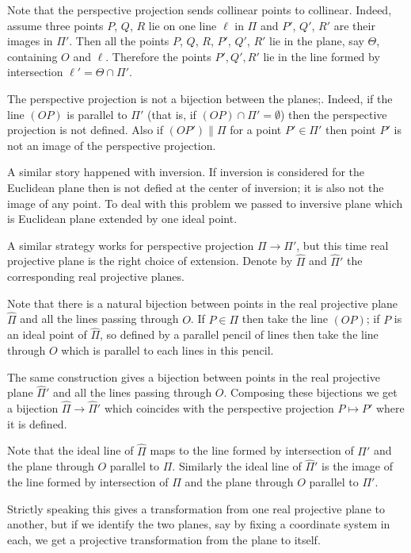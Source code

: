 Note that the perspective projection sends collinear points to collinear.
Indeed, assume three points $P$, $Q$, $R$ lie on one line $\ell$ in $\Pi$
and $P'$, $Q'$, $R'$ are their images in $\Pi'$.
Then all the points $P$, $Q$, $R$, $P'$, $Q'$, $R'$ lie in the plane, say $\Theta$, containing $O$ and $\ell$.
Therefore the points $P',Q',R'$ lie in the line formed by intersection $\ell'=\Theta\cap \Pi'$.

The perspective projection is not a bijection between the planes;.
Indeed, if the line $(OP)$ is parallel to $\Pi'$ 
(that is, if $(OP)\cap\Pi'=\emptyset$)
then the perspective projection is not defined.
Also if  $(OP')\parallel \Pi$ 
for a point $P'\in \Pi'$
then point $P'$ is not an image of the perspective projection.

A similar story happened with inversion.
If inversion is considered for the Euclidean plane
then is not defied at the center of inversion;
it is also not the image of any point.
To deal with this problem we passed to inversive plane 
which is Euclidean plane extended by one ideal point.

A similar strategy works for perspective projection $\Pi\to\Pi'$, but this time real projective plane is the right choice of extension.
Denote by $\hat \Pi$ and $\hat \Pi'$ 
the corresponding real projective planes.

Note that there is a natural bijection between points in the real projective plane $\hat \Pi$ and all the lines passing through $O$.
If $P\in \Pi$ then take the line $(OP)$;
if $P$ is an ideal point of $\hat \Pi$, so defined by a parallel pencil of lines then take the line through $O$ which is parallel to each lines in this pencil. 

The same construction gives a bijection between points in the real projective plane $\hat \Pi'$ and all the lines passing through $O$.
Composing these bijections we get a bijection $\hat \Pi\to \hat \Pi'$ which coincides with the perspective projection $P\mapsto P'$
where it is defined.

Note that the ideal line of $\hat\Pi$ maps to the line formed by intersection of $\Pi'$ and the plane through $O$ parallel to $\Pi$.
Similarly the ideal line of $\hat\Pi'$
is the image of the line formed by intersection of $\Pi$ and the plane through $O$ parallel to $\Pi'$.

Strictly speaking this gives a transformation from one real projective plane to another, 
but if we identify the two planes, say by fixing a coordinate system in each, 
we get a projective transformation from the plane to itself. 


